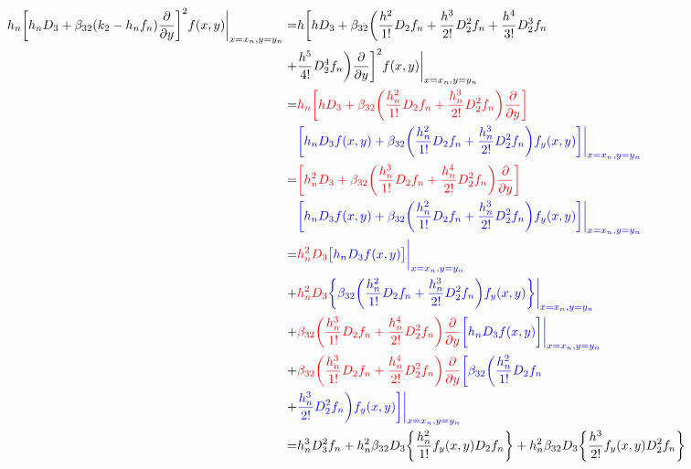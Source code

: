 \documentclass[12 pt]{article}
\begin{document}
{
\normalsize
\begin{align*}
h_{n}\bigg[h_{n}D_{3}+\beta_{32}(k_{2}-h_{n}f_{n})\frac{\partial}{\partial y}\bigg]^{2}f(x,y)\bigg\vert_{x = x_{n}, y= y_{n}} =& h\bigg[hD_{3} + \beta_{32}\bigg(\frac{h^{2}}{1!}D_{2}f_{n} + \frac{h^{3}}{2!}D_{2}^{2}f_{n} + \frac{h^{4}}{3!}D_{2}^{3}f_{n} \\
    +& \frac{h^{5}}{4!}D_{2}^{4}f_{n}\bigg)\frac{\partial}{\partial y}\bigg]^{2}f(x,y)\bigg\vert_{x = x_{n}, y= y_{n}}\\
	=& \color{red}h_{n}\bigg[hD_{3} + \beta_{32}\bigg(\frac{h_{n}^{2}}{1!}D_{2}f_{n} +\frac{h_{n}^{3}}{2!}D_{2}^{2}f_{n}  \bigg)\frac{\partial}{\partial y}\bigg]\\
	&\color{blue}\bigg[h_{n}D_{3}f(x,y) + \beta_{32}\bigg(\frac{h_{n}^{2}}{1!}D_{2}f_{n} + \frac{h_{n}^{3}}{2!}D_{2}^{2}f_{n}\bigg)f_{y}(x,y)\bigg]\bigg\vert_{x = x_{n}, y= y_{n}}\\
	=& \color{red}\bigg[h_{n}^{2}D_{3} + \beta_{32}\bigg(\frac{h_{n}^{3}}{1!}D_{2}f_{n} + \frac{h_{n}^{4}}{2!}D_{2}^{2}f_{n}  \bigg)\frac{\partial}{\partial y}\bigg]\\
	&\color{blue}\bigg[h_{n}D_{3}f(x,y) + \beta_{32}\bigg(\frac{h_{n}^{2}}{1!}D_{2}f_{n} + \frac{h_{n}^{3}}{2!}D_{2}^{2}f_{n}\bigg)f_{y}(x,y)\bigg]\bigg\vert_{x = x_{n}, y= y_{n}}\\
	=& \color{red}h_{n}^{2}D_{3}\color{blue}\big[h_{n}D_{3}f(x,y)\big]\bigg\vert_{x = x_{n}, y= y_{n}} \color{black} \\
	+& \color{red}h_{n}^{2}D_{3}\color{blue}\bigg\{\beta_{32}\bigg(\frac{h_{n}^{2}}{1!}D_{2}f_{n} + \frac{h_{n}^{3}}{2!}D_{2}^{2}f_{n}\bigg)f_{y}(x,y)\bigg\}\bigg\vert_{x = x_{n}, y= y_{n}} \color{black}\\
	+& \color{red}\beta_{32}\bigg(\frac{h_{n}^{3}}{1!}D_{2}f_{n} + \frac{h_{n}^{4}}{2!}D_{2}^{2}f_{n} \bigg)\frac{\partial}{\partial y}\color{blue}\bigg[h_{n}D_{3}f(x,y)\bigg]\bigg\vert_{x = x_{n}, y= y_{n}}\\ 
	+& \color{red}\beta_{32}\bigg(\frac{h_{n}^{3}}{1!}D_{2}f_{n} + \frac{h_{n}^{4}}{2!}D_{2}^{2}f_{n} \bigg)\frac{\partial}{\partial y}\color{blue}\bigg[\beta_{32}\bigg(\frac{h_{n}^{2}}{1!}D_{2}f_{n} \\
	+&\color{blue}\frac{h_{n}^{3}}{2!}D_{2}^{2}f_{n}\bigg)f_{y}(x,y)\bigg]\bigg\vert_{x = x_{n}, y= y_{n}}\\
	=& h_{n}^{3}D_{3}^{2}f_{n} + h_{n}^{2}\beta_{32}D_{3}\bigg\{ \frac{h_{n}^{2}}{1!}f_{y}(x,y)D_{2}f_{n}\bigg\} + h_{n}^{2}\beta_{32}D_{3}\bigg\{\frac{h^{3}}{2!}f_{y}(x,y)D_{2}^{2}f_{n}\bigg\}\\

\end{align*}}
\end{document}
